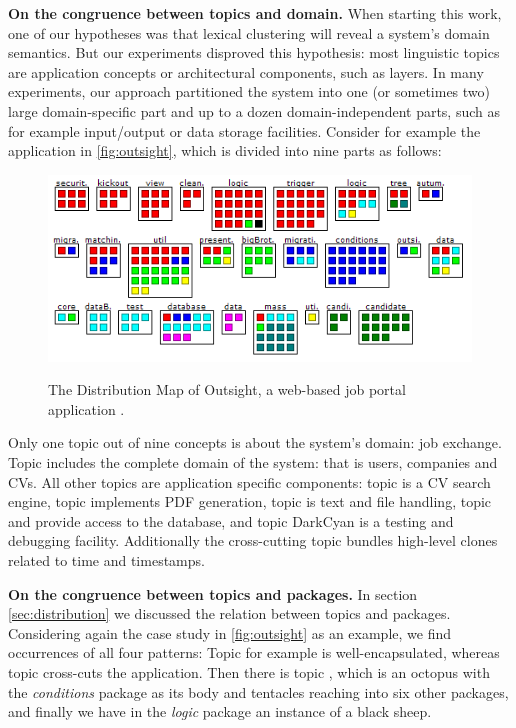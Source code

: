 \textbf{On the congruence between topics and domain.} When starting this work, one of our hypotheses was that lexical clustering will reveal a system's domain semantics. But our experiments disproved this hypothesis: most linguistic topics are application concepts or architectural components, such as layers. In many experiments, our approach partitioned the system into one (or sometimes two) large domain-specific part and up to a dozen domain-independent parts, such as for example input/output or data storage facilities. Consider for example the application in \autoref{fig:outsight}, which is divided into nine parts as follows:

\begin{figure}[h]
  \includegraphics[width=\linewidth]{fig/hapax-outsight-distribution}\\
  \caption{The Distribution Map of Outsight, a web-based job portal application \cite{Kuhn06a}.}\label{fig:outsight}
\end{figure}

Only one topic out of nine concepts is about the system's domain: job exchange. Topic \red includes the complete domain of the system: that is users, companies and CVs. All other topics are application specific components: topic \blue is a CV search engine, topic \darkgreen implements PDF generation, topic \green is text and file handling, topic \cyan and \magenta provide access to the database, and topic DarkCyan is a testing and debugging facility. Additionally the cross-cutting topic \yellow bundles high-level clones related to time and timestamps.

\textbf{On the congruence between topics and packages.} In section \autoref{sec:distribution} we discussed the relation between topics and packages. Considering again the case study in \autoref{fig:outsight} as an example, we find occurrences of all four patterns: Topic \darkgreen for example is well-encapsulated, whereas topic \yellow cross-cuts the application. Then there is topic \blue, which is an octopus with the \emph{conditions} package as its body and tentacles reaching into six other packages, and finally we have in the \emph{logic} package an instance of a black sheep.


